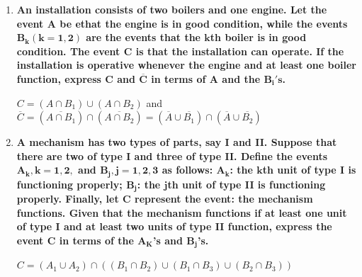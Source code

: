 \documentclass[10pt, oneside]{article}
\begin{document}
\begin{enumerate}[label=1.\arabic*]
Since $P(A \cap B) = P(C \cap B) = 0$ implies $A \cap B = C \cap B = \O$, we must also have $A \cap B \cap C = \O$ which implies $P(A \cap B \cap C) = 0$. By Theorem 1.4,

\begin{align*}
P(A \cup B \cup C) &= P(A) + P(B) + P(C) - P(A \cap B) - P(A \cap C) - P(B \cap C) + P(A \cap B \cap C) \\
&= 1/4 + 1/4 + 1/4 - 1/8 \\
&= \boxed{5/8}
\end{align*}

\item  \begin{tcolorbox}[
  colback=Cerulean!5!white,
  colframe=Cerulean!75!black]
\textbf{An installation consists of two boilers and one engine. Let the event $\bm{A}$ be ethat the engine is in good condition, while the events $\bm{B_k (k = 1, 2)}$ are the events that the $\bm{k}$th boiler is in good condition. The event $\bm{C}$ is that the installation can operate. If the installation is operative whenever the engine and at least one boiler function, express $\bm{C}$ and $\bm{\overline{C}}$ in terms of $\bm{A}$ and the $\bm{B_i's}$.}
\end{tcolorbox}

$\boxed{C = (A \cap B_1) \cup (A \cap B_2)}$ and $\overline{C} = (\overline{A \cap B_1}) \cap (\overline{A \cap B_2}) = \boxed{(\overline{A} \cup \overline{B_1}) \cap (\overline{A} \cup \overline{B_2})}$

\item  \begin{tcolorbox}[
  colback=Cerulean!5!white,
  colframe=Cerulean!75!black]
\textbf{A mechanism has two types of parts, say I and II. Suppose that there are two of type I and three of type II. Define the events $\bm{A_k, k = 1, 2,}$ and $\bm{B_j, j = 1, 2, 3}$ as follows: $\bm{A_k}$: the $\bm{k}$th unit of type I is functioning properly; $\bm{B_j}$: the $\bm{j}$th unit of type II is functioning properly. Finally, let $\bm{C}$ represent the event: the mechanism functions. Given that the mechanism functions if at least one unit of type I and at least two units of type II function, express the event $\bm{C}$ in terms of the $\bm{A_K}$'s and $\bm{B_j}$'s.}
\end{tcolorbox}

$\boxed{C = (A_1 \cup A_2) \cap ((B_1 \cap B_2) \cup (B_1 \cap B_3) \cup (B_2 \cap B_3))}$

\end{enumerate}
\end{document}
